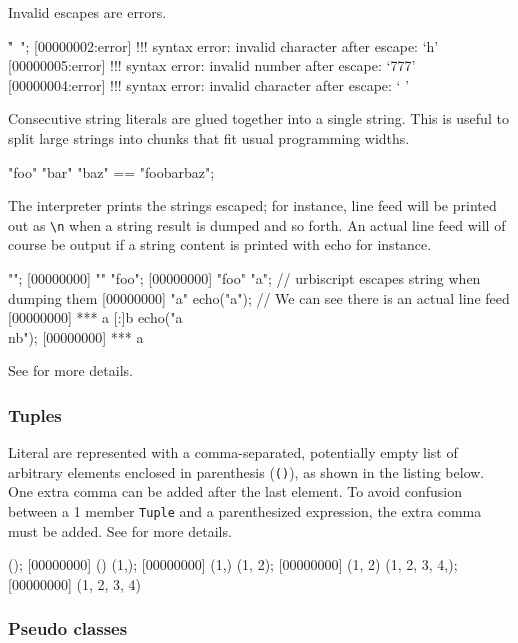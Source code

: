 Invalid escapes are errors.

\begin{urbiscript}
"\h{}\ ";
[00000002:error] !!! syntax error: invalid character after \-escape: `h'
[00000005:error] !!! syntax error: invalid number after \-escape: `777'
[00000004:error] !!! syntax error: invalid character after \-escape: ` '
\end{urbiscript}

Consecutive string literals are glued together into a single string.  This
is useful to split large strings into chunks that fit usual programming
widths.

\begin{urbiassert}
"foo" "bar" "baz" == "foobarbaz";
\end{urbiassert}

The interpreter prints the strings escaped; for instance, line feed will be
printed out as \lstinline|\n| when a string result is dumped and so
forth. An actual line feed will of course be output if a string content is
printed with echo for instance.

\begin{urbiscript}
"";
[00000000] ""
"foo";
[00000000] "foo"
"a\nb"; // urbiscript escapes string when dumping them
[00000000] "a\nb"
echo("a\nb"); // We can see there is an actual line feed
[00000000] *** a
[:]b
echo("a\\nb");
[00000000] *** a\nb
\end{urbiscript}

See  for more details.

\subsubsection{Tuples}
\label{sec:lang:tuples}

Literal  are represented with a comma-separated, potentially
empty list of arbitrary elements enclosed in parenthesis (\lstinline|()|),
as shown in the listing below.  One extra comma can be added after the last
element.  To avoid confusion between a 1 member \lstinline{Tuple} and a
parenthesized expression, the extra comma must be added.  See
 for more details.

\begin{urbiscript}
();
[00000000] ()
(1,);
[00000000] (1,)
(1, 2);
[00000000] (1, 2)
(1, 2, 3, 4,);
[00000000] (1, 2, 3, 4)
\end{urbiscript}


\subsubsection{Pseudo classes}
\label{sec:lang:class}

